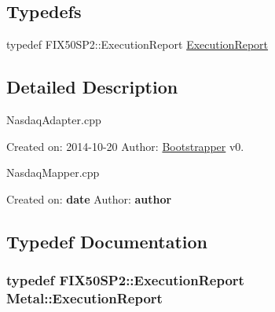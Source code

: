 \subsection*{Typedefs}
\begin{DoxyCompactItemize}
\item 
typedef F\+I\+X50\+S\+P2\+::\+Execution\+Report \hyperlink{namespaceMetal_af4294c176f6aecf9f75e9b106b117aa1}{Execution\+Report}
\end{DoxyCompactItemize}


\subsection{Detailed Description}
Nasdaq\+Adapter.\+cpp

Created on\+: 2014-\/10-\/20 Author\+: \hyperlink{namespaceBootstrapper}{Bootstrapper} v0.

Nasdaq\+Mapper.\+cpp

Created on\+: {\bfseries date} Author\+: {\bfseries author} 

\subsection{Typedef Documentation}
\hypertarget{namespaceMetal_af4294c176f6aecf9f75e9b106b117aa1}{}
\subsubsection[{Execution\+Report}]{\setlength{\rightskip}{0pt plus 5cm}typedef F\+I\+X50\+S\+P2\+::\+Execution\+Report {\bf Metal\+::\+Execution\+Report}}\label{namespaceMetal_af4294c176f6aecf9f75e9b106b117aa1}
